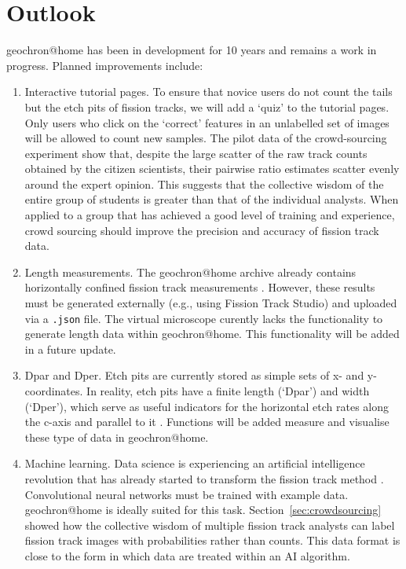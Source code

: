 \documentclass[gchron, manuscript]{copernicus}
\begin{document}
\section{Outlook}\label{sec:outlook}

geochron@home has been in development for 10 years and
remains a work in progress. Planned improvements include:

\begin{enumerate}
\item Interactive tutorial pages. To ensure that novice users do not
  count the tails but the etch pits of fission tracks, we will add a
  `quiz' to the tutorial pages. Only users who click on the `correct'
  features in an unlabelled set of images will be allowed to count new
  samples. The pilot data of the crowd-sourcing experiment show that,
  despite the large scatter of the raw track counts obtained by the
  citizen scientists, their pairwise ratio estimates scatter evenly
  around the expert opinion. This suggests that the collective wisdom
  of the entire group of students is greater than that of the
  individual analysts. When applied to a group that has achieved a
  good level of training and experience, crowd sourcing should improve
  the precision and accuracy of fission track data.
\item Length measurements. The geochron@home archive already
  contains horizontally confined fission track measurements
  \citep{tamer2025}.  However, these results must be generated
  externally (e.g., using Fission Track Studio) and uploaded via a
  \texttt{.json} file.  The virtual microscope curently lacks the
  functionality to generate length data within
  geochron@home. This functionality will be added in a future
  update.
\item Dpar and Dper. Etch pits are currently stored as simple sets of
  x- and y-coordinates.  In reality, etch pits have a finite length
  (`Dpar') and width (`Dper'), which serve as useful indicators for
  the horizontal etch rates along the c-axis and parallel to it
  \citep{donelick1993}. Functions will be added measure and visualise
  these type of data in geochron@home.
\item Machine learning. Data science is experiencing an artificial
  intelligence revolution that has already started to transform the
  fission track method \citep{nachtergaele2020}.  Convolutional neural
  networks must be trained with example data. geochron@home
  is ideally suited for this task. Section~\ref{sec:crowdsourcing}
  showed how the collective wisdom of multiple fission track analysts
  can label fission track images with probabilities rather than
  counts. This data format is close to the form in which data are
  treated within an AI algorithm.\medskip


\end{enumerate}
\end{document}
